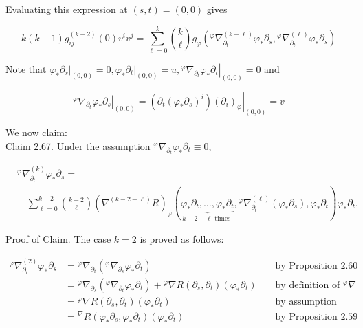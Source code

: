 \documentclass[10pt, letterpaper]{article}
\begin{document}
Evaluating this expression at $(s, t)=(0,0)$ gives

$$
k(k-1) g_{i j}^{(k-2)}(0) v^{i} v^{j}=\sum_{\ell=0}^{k}\binom{k}{\ell} g_{\varphi}\left({ }^{\varphi} \nabla_{\partial_{t}}^{(k-\ell)} \varphi_{*} \partial_{s},{ }^{\varphi} \nabla_{\partial_{t}}^{(\ell)} \varphi_{*} \partial_{s}\right)
$$

Note that $\left.\varphi_{*} \partial_{s}\right|_{(0,0)}=0,\left.\varphi_{*} \partial_{t}\right|_{(0,0)}=u,\left.{ }^{\varphi} \nabla_{\partial_{t}} \varphi_{*} \partial_{t}\right|_{(0,0)}=0$ and

$$
\left.{ }^{\varphi} \nabla_{\partial_{t}} \varphi_{*} \partial_{s}\right|_{(0,0)}=\left.\left(\partial_{t}\left(\varphi_{*} \partial_{s}\right)^{i}\right)\left(\partial_{i}\right)_{\varphi}\right|_{(0,0)}=v
$$

We now claim:\\
Claim 2.67. Under the assumption ${ }^{\varphi} \nabla_{\partial_{t}} \varphi_{*} \partial_{t} \equiv 0$,

$$
\begin{aligned}
& { }^{\varphi} \nabla_{\partial_{t}}^{(k)} \varphi_{*} \partial_{s}= \\
& \quad \sum_{\ell=0}^{k-2}\binom{k-2}{\ell}\left(\nabla^{(k-2-\ell)} R\right)_{\varphi}(\underbrace{\varphi_{*} \partial_{t}, \ldots, \varphi_{*} \partial_{t}}_{k-2-\ell \text { times }},{ }^{\varphi} \nabla_{\partial_{t}}^{(\ell)}\left(\varphi_{*} \partial_{s}\right), \varphi_{*} \partial_{t}) \varphi_{*} \partial_{t} .
\end{aligned}
$$

Proof of Claim. The case $k=2$ is proved as follows:

$$
\begin{aligned}
{ }^{\varphi} \nabla_{\partial_{t}}^{(2)} \varphi_{*} \partial_{s} & ={ }^{\varphi} \nabla_{\partial_{t}}\left({ }^{\varphi} \nabla_{\partial_{s}} \varphi_{*} \partial_{t}\right) & & \text { by Proposition } 2.60 \\
& ={ }^{\varphi} \nabla_{\partial_{s}}\left({ }^{\varphi} \nabla_{\partial_{t}} \varphi_{*} \partial_{t}\right)+{ }^{\varphi} \nabla R\left(\partial_{s}, \partial_{t}\right)\left(\varphi_{*} \partial_{t}\right) & & \text { by definition of }{ }^{\varphi} \nabla \\
& ={ }^{\varphi} \nabla R\left(\partial_{s}, \partial_{t}\right)\left(\varphi_{*} \partial_{t}\right) & & \text { by assumption } \\
& ={ }^{\nabla} R\left(\varphi_{*} \partial_{s}, \varphi_{*} \partial_{t}\right)\left(\varphi_{*} \partial_{t}\right) & & \text { by Proposition } 2.59
\end{aligned}
$$
\end{document}
